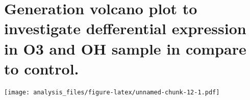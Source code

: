 \documentclass[]{article}
\newenvironment{Shaded}{\begin{snugshade}}{\end{snugshade}}
\newcommand{\DataTypeTok}[1]{\textcolor[rgb]{0.13,0.29,0.53}{#1}}
\newcommand{\KeywordTok}[1]{\textcolor[rgb]{0.13,0.29,0.53}{\textbf{#1}}}
\newcommand{\NormalTok}[1]{#1}
\newcommand{\OperatorTok}[1]{\textcolor[rgb]{0.81,0.36,0.00}{\textbf{#1}}}
\newcommand{\OtherTok}[1]{\textcolor[rgb]{0.56,0.35,0.01}{#1}}
\newcommand{\StringTok}[1]{\textcolor[rgb]{0.31,0.60,0.02}{#1}}
\begin{document}
\hypertarget{generation-volcano-plot-to-investigate-defferential-expression-in-o3-and-oh-sample-in-compare-to-control.}{%
\section{Generation volcano plot to investigate defferential expression
in O3 and OH sample in compare to
control.}\label{generation-volcano-plot-to-investigate-defferential-expression-in-o3-and-oh-sample-in-compare-to-control.}}

\begin{Shaded}
\end{Shaded}

\texttt{[image: analysis\_files/figure-latex/unnamed-chunk-12-1.pdf]}
\end{document}
